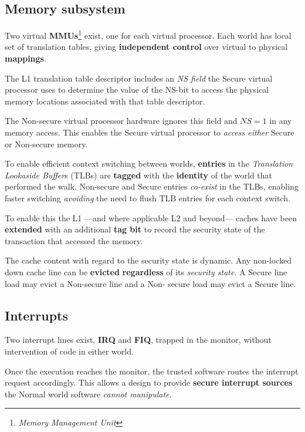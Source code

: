 \subsection{Memory subsystem}

Two virtual \textbf{MMUs}\footnote{\textit{Memory Management Unit}} exist, one for each virtual processor.
Each world has local set of translation tables, giving \textbf{independent control} over virtual to physical \textbf{mappings}.

The L1 translation table descriptor includes an \textit{NS field} the Secure virtual processor uses to determine the value of the NS-bit to access the physical memory locations associated with that table descriptor.

The Non-secure virtual processor hardware ignores this field and $NS=1$ in any memory access.
This enables the Secure virtual processor to \textit{access either} Secure or Non-secure memory.

To enable efficient context switching between worlds, \textbf{entries} in the
\textit{Translation Lookaside Buffer}s (TLBs) are \textbf{tagged} with the \textbf{identity} of the world that performed the walk.
Non-secure and Secure entries \textit{co-exist} in the TLBs,
enabling faster switching \textit{avoiding} the need to flush TLB entries for each context switch.

To enable this the L1 {---}and where applicable L2 and beyond{---} caches
have been \textbf{extended} with an additional \textbf{tag bit} to record the security
state of the transaction that accessed the memory.

The cache content with regard to the security state is dynamic. Any
non-locked down cache line can be \textbf{evicted} \textbf{regardless} of its \textit{security state}.
A Secure line load may evict a Non-secure line and a Non-
secure load may evict a Secure line.

\subsection{Interrupts}

Two interrupt lines exist, \textbf{IRQ} and \textbf{FIQ}, trapped in the monitor, without intervention of code in either world.

Once the execution reaches the monitor, the trusted software routes the
interrupt request accordingly.
This allows a design to provide \textbf{secure interrupt sources} the Normal world software \textit{cannot manipulate}.

